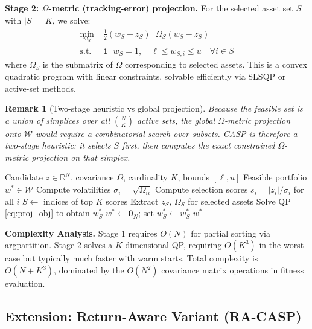 \documentclass[10pt,twocolumn,a4paper]{article}
\newtheorem{remark}{Remark}
\begin{document}
\textbf{Stage 2: $\Omega$-metric (tracking-error) projection.}
For the selected asset set $S$ with $|S| = K$, we solve:
\begin{align}
\min_{w_S} \; & \tfrac{1}{2}(w_S - z_S)^\top \Omega_S (w_S - z_S) \label{eq:proj_obj} \\
\text{s.t.} \; & \mathbf{1}^\top w_S = 1, \quad \ell \leq w_{S,i} \leq u \quad \forall i \in S
\end{align}
where $\Omega_S$ is the submatrix of $\Omega$ corresponding to selected assets. This is a convex quadratic program with linear constraints, solvable efficiently via SLSQP or active-set methods.

\begin{remark}[Two-stage heuristic vs global projection]
Because the feasible set is a union of simplices over all $\binom{N}{K}$ active sets, the global $\Omega$-metric projection onto $\mathcal{W}$ would require a combinatorial search over subsets. CASP is therefore a two-stage heuristic: it selects $S$ first, then computes the exact constrained $\Omega$-metric projection on that simplex.
\end{remark}

\begin{algorithm}[H]
\caption{CASP: Covariance-Aware Simplex Projection}
\label{alg:casp}
\begin{algorithmic}[1]
\REQUIRE Candidate $z \in \mathbb{R}^N$, covariance $\Omega$, cardinality $K$, bounds $[\ell, u]$
\ENSURE Feasible portfolio $w^* \in \mathcal{W}$
\STATE Compute volatilities $\sigma_i = \sqrt{\Omega_{ii}}$
\STATE Compute selection scores $s_i = |z_i| / \sigma_i$ for all $i$
\STATE $S \gets$ indices of top $K$ scores
\STATE Extract $z_S$, $\Omega_S$ for selected assets
\STATE Solve QP \eqref{eq:proj_obj} to obtain $w_S^*$
\STATE $w^* \gets \mathbf{0}_N$; set $w^*_S \gets w_S^*$
\RETURN $w^*$
\end{algorithmic}
\end{algorithm}

\textbf{Complexity Analysis.} Stage 1 requires $O(N)$ for partial sorting via argpartition. Stage 2 solves a $K$-dimensional QP, requiring $O(K^3)$ in the worst case but typically much faster with warm starts. Total complexity is $O(N + K^3)$, dominated by the $O(N^2)$ covariance matrix operations in fitness evaluation.

\subsection{Extension: Return-Aware Variant (RA-CASP)}
\end{document}

